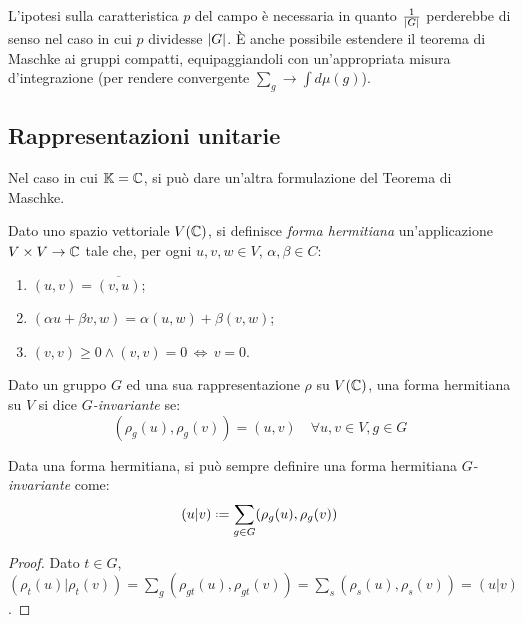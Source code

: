 L'ipotesi sulla caratteristica $ p $ del campo è necessaria in quanto $ \frac{1}{\left\lvert G\right\rvert} $ perderebbe di senso nel caso in cui $ p $ dividesse $ \left\lvert G\right\rvert $. È anche possibile estendere il teorema di Maschke ai gruppi compatti, equipaggiandoli con un'appropriata misura d'integrazione (per rendere convergente $ \sum_{g} \rightarrow \int d\mu(g) $).

\subsection{Rappresentazioni unitarie}

Nel caso in cui $ \mathbb{K} = \mathbb{C} $, si può dare un'altra formulazione del Teorema di Maschke.

\begin{definition}
	Dato uno spazio vettoriale $ V(\mathbb{C}) $, si definisce \textit{forma hermitiana} un'applicazione $ V \times V \rightarrow \mathbb{C} $ tale che, per ogni $ u,v,w \in V $, $ \alpha,\beta \in C $:
	\begin{enumerate}
		\item $ (u,v) = \overline{(v,u)} $;
		\item $ (\alpha u + \beta v, w) = \alpha (u,w) + \beta (v,w) $;
		\item $ (v,v) \ge 0 \land (v,v) = 0 \,\Leftrightarrow\, v = 0 $.
	\end{enumerate}
\end{definition}

\begin{definition}
	Dato un gruppo $ G $ ed una sua rappresentazione $ \rho $ su $ V(\mathbb{C}) $, una forma hermitiana su $ V $ si dice $ G $\textit{-invariante} se:
	\begin{equation}
		(\rho_g(u),\rho_g(v)) = (u,v) \quad\forall u,v \in V, g \in G
		\label{eq:8.7}
	\end{equation}
\end{definition}

\begin{proposition}\label{herm-inv}
	Data una forma hermitiana, si può sempre definire una forma hermitiana $ G $\textit{-invariante} come:
	\begin{equation}
		(u|v) \defeq \sum_{g \in G} (\rho_g(u), \rho_g(v))
		\label{eq:8.8}
	\end{equation}
\end{proposition}
\begin{proof}
	Dato $ t \in G $, $ (\rho_t(u)|\rho_t(v)) = \sum_{g} (\rho_{gt}(u),\rho_{gt}(v)) = \sum_{s} (\rho_s(u),\rho_s(v)) = (u|v) $.
\end{proof}

